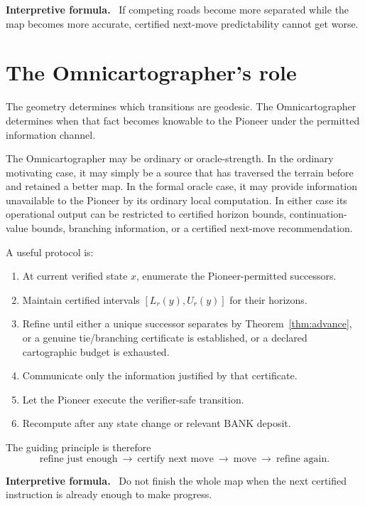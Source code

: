 \documentclass[11pt]{article}
\theoremstyle{definition}
\theoremstyle{remark}
\newcommand{\BANK}{\mathrm{BANK}}
\newenvironment{interpretiveformula}{%
  \begin{center}\begin{minipage}{0.92\textwidth}\small
  \textbf{Interpretive formula.}\ }{\end{minipage}\end{center}}
\begin{document}
\begin{interpretiveformula}
If competing roads become more separated while the map becomes more accurate, certified next-move predictability cannot get worse.
\end{interpretiveformula}

\section{The Omnicartographer's role}
The geometry determines which transitions are geodesic. The Omnicartographer determines when that fact becomes knowable to the Pioneer under the permitted information channel.

The Omnicartographer may be ordinary or oracle-strength. In the ordinary motivating case, it may simply be a source that has traversed the terrain before and retained a better map. In the formal oracle case, it may provide information unavailable to the Pioneer by its ordinary local computation. In either case its operational output can be restricted to certified horizon bounds, continuation-value bounds, branching information, or a certified next-move recommendation.

A useful protocol is:
\begin{enumerate}
\item At current verified state $x$, enumerate the Pioneer-permitted successors.
\item Maintain certified intervals $[L_r(y),U_r(y)]$ for their horizons.
\item Refine until either a unique successor separates by Theorem~\ref{thm:advance}, or a genuine tie/branching certificate is established, or a declared cartographic budget is exhausted.
\item Communicate only the information justified by that certificate.
\item Let the Pioneer execute the verifier-safe transition.
\item Recompute after any state change or relevant $\BANK$ deposit.
\end{enumerate}

The guiding principle is therefore
\[
\boxed{\text{refine just enough}\ \longrightarrow\ \text{certify next move}\ \longrightarrow\ \text{move}\ \longrightarrow\ \text{refine again}.}
\]

\begin{interpretiveformula}
Do not finish the whole map when the next certified instruction is already enough to make progress.
\end{interpretiveformula}
\end{document}
